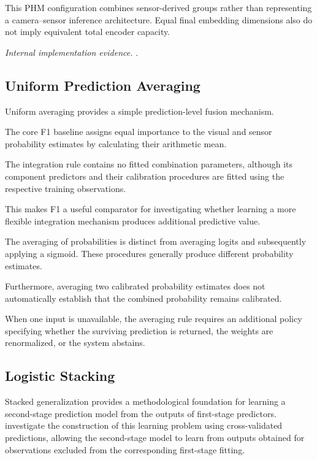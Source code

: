 This PHM configuration combines sensor-derived groups rather than representing a camera–sensor inference architecture. Equal final embedding dimensions also do not imply equivalent total encoder capacity.

\noindent\textit{Internal implementation evidence.} .

\subsection{Uniform Prediction Averaging}

Uniform averaging provides a simple prediction-level fusion mechanism.

The core F1 baseline assigns equal importance to the visual and sensor probability estimates by calculating their arithmetic mean.

The integration rule contains no fitted combination parameters, although its component predictors and their calibration procedures are fitted using the respective training observations.

This makes F1 a useful comparator for investigating whether learning a more flexible integration mechanism produces additional predictive value.

The averaging of probabilities is distinct from averaging logits and subsequently applying a sigmoid. These procedures generally produce different probability estimates.

Furthermore, averaging two calibrated probability estimates does not automatically establish that the combined probability remains calibrated.

When one input is unavailable, the averaging rule requires an additional policy specifying whether the surviving prediction is returned, the weights are renormalized, or the system abstains.

\subsection{Logistic Stacking}

Stacked generalization provides a methodological foundation for learning a second-stage prediction model from the outputs of first-stage predictors. \textcite{Ting1999StackedGeneralization} investigate the construction of this learning problem using cross-validated predictions, allowing the second-stage model to learn from outputs obtained for observations excluded from the corresponding first-stage fitting.

